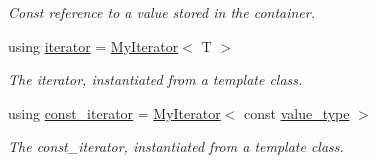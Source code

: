 \begin{DoxyCompactItemize}
\begin{DoxyCompactList}\small\item\em Const reference to a value stored in the container. \end{DoxyCompactList}\item 
using \hyperlink{classsc_1_1vector_a9e5d5cc35e379aa27a93989f4a71413c}{iterator} = \hyperlink{classsc_1_1MyIterator}{My\+Iterator}$<$ T $>$
\begin{DoxyCompactList}\small\item\em The iterator, instantiated from a template class. \end{DoxyCompactList}\item 
using \hyperlink{classsc_1_1vector_a1e50aa429ea9de6ead4bfdb8614c1c9a}{const\+\_\+iterator} = \hyperlink{classsc_1_1MyIterator}{My\+Iterator}$<$ const \hyperlink{classsc_1_1vector_ad37f5bfa688e43c420ed565e4bff6fac}{value\+\_\+type} $>$
\begin{DoxyCompactList}\small\item\em The const\+\_\+iterator, instantiated from a template class. \end{DoxyCompactList}\end{DoxyCompactItemize}

